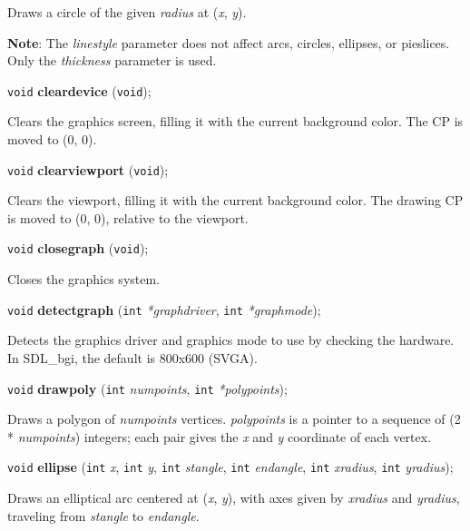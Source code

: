 \documentclass[a4paper,11pt]{article}
\newcommand{\SDLbgi}{SDL\_bgi}
\newcommand{\V}{\texttt{void}}      %
\newcommand{\I}{\texttt{int}}       %
\newcommand{\func}[1]{\textbf{#1}}  %
\newcommand{\A}[1]{\emph{#1}}       %
\newenvironment{bgi}
{ %
  \begin{snugshade}
}
{ %
  \end{snugshade}
}
\begin{document}
Draws a circle of the given \A{radius} at (\A{x}, \A{y}).

\textbf{Note}: The \A{linestyle} parameter does not affect arcs,
circles, ellipses, or pie\-slices. Only the \A{thickness} parameter is
used.


\begin{bgi}
\V{} \func{cleardevice} (\V{});
\end{bgi}

Clears the graphics screen, filling it with the current background
color. The CP is moved to (0, 0).


\begin{bgi}
\V{} \func{clearviewport} (\V{});
\end{bgi}

Clears the viewport, filling it with the current background color. The
drawing CP is moved to (0, 0), relative to the viewport.


\begin{bgi}
\V{} \func{closegraph} (\V{});
\end{bgi}

Closes the graphics system.


\begin{bgi}
\V{} \func{detectgraph} (\I{} \A{*graphdriver}, \I{} \A{*graphmode});
\end{bgi}

Detects the graphics driver and graphics mode to use by checking the
hardware. In \SDLbgi, the default is 800x600 (SVGA).


\begin{bgi}
\V{} \func{drawpoly} (\I{} \A{numpoints}, \I{} \A{*polypoints});
\end{bgi}

Draws a polygon of \A{numpoints} vertices. \A{polypoints} is a
pointer to a sequence of (2 * \A{numpoints}) integers; each pair gives
the \A{x} and \A{y} coordinate of each vertex.


\begin{bgi}
\V{} \func{ellipse} (\I{} \A{x}, \I{} \A{y}, \I{} \A{stangle}, \I{}
\A{endangle}, \I{} \A{xradius}, \I{} \A{yradius});
\end{bgi}

Draws an elliptical arc centered at (\A{x}, \A{y}), with axes given by
\A{xradius} and \A{yradius}, traveling from \A{stangle} to
\A{endangle}.
\end{document}
